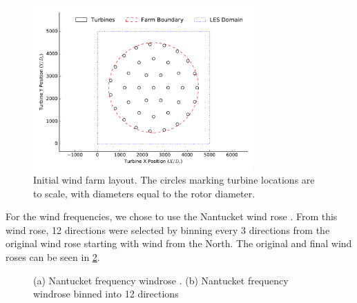 \documentclass[conf]{new-aiaa}
\begin{document}
\begin{figure}[ht]
	\centering
	\includegraphics[width=0.75\textwidth]{final_images/round_farm_38Turbines_5DSpacing.pdf}
	\caption{Initial wind farm layout. The circles marking turbine locations are to scale, with diameters equal to the rotor diameter.}
	\label{fig:starting-layout}
\end{figure}

For the wind frequencies, we chose to use the Nantucket wind rose \cite{wrcc2017} %
. From this wind rose, 12 directions were selected by binning every 3 directions from the original wind rose starting with wind from the North. The original and final wind roses can be seen in \cref{fig:windrose}.

\begin{figure}[ht]
	\centering
	\caption{(a) Nantucket frequency windrose \cite{wrcc2017}. (b) Nantucket frequency windrose binned into 12 directions}
	\label{fig:windrose}
\end{figure}
\end{document}
